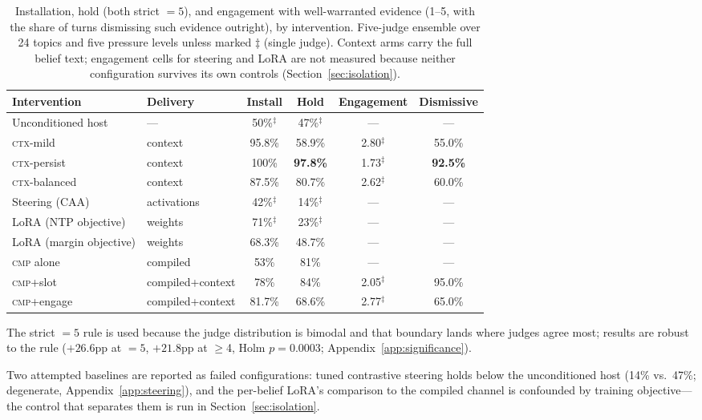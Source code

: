 \begin{table}[tb]
\centering
\caption{Installation, hold (both strict \(=5\)), and engagement with well-warranted evidence
(1--5, with the share of turns dismissing such evidence outright), by intervention. Five-judge
ensemble over 24 topics and five pressure levels unless marked \(\ddagger\) (single judge).
Context arms carry the full belief text; engagement cells for steering and LoRA are not
measured because neither configuration survives its own controls
(Section~\ref{sec:isolation}).}
\label{tab:install-hold}
\small
\setlength{\tabcolsep}{4pt}
\begin{tabular}{llcccc}
\toprule
Intervention & Delivery & Install & Hold & Engagement & Dismissive \\
\midrule
Unconditioned host & --- & 50\%\(^\ddagger\) & 47\%\(^\ddagger\) & --- & --- \\
\textsc{ctx}-mild & context & 95.8\% & 58.9\% & 2.80\(^\ddagger\) & 55.0\% \\
\textsc{ctx}-persist & context & 100\% & \textbf{97.8\%} & 1.73\(^\ddagger\) & \textbf{92.5\%} \\
\textsc{ctx}-balanced & context & 87.5\% & 80.7\% & 2.62\(^\ddagger\) & 60.0\% \\
Steering (CAA) & activations & 42\%\(^\ddagger\) & 14\%\(^\ddagger\) & --- & --- \\
LoRA (NTP objective) & weights & 71\%\(^\ddagger\) & 23\%\(^\ddagger\) & --- & --- \\
LoRA (margin objective) & weights & 68.3\% & 48.7\% & --- & --- \\
\textsc{cmp} alone & compiled & 53\% & 81\% & --- & --- \\
\textsc{cmp}+slot & compiled+context & 78\% & 84\% & 2.05\(^\ddagger\) & 95.0\% \\
\textsc{cmp}+engage & compiled+context & 81.7\% & 68.6\% & 2.77\(^\ddagger\) & 65.0\% \\
\bottomrule
\end{tabular}
\end{table}

The strict \(=5\) rule is used because the judge distribution is bimodal and that boundary
lands where judges agree most; results are robust to the rule (\(+26.6\)pp at \(=5\),
\(+21.8\)pp at \(\ge\)4, Holm \(p=0.0003\); Appendix~\ref{app:significance}).

Two attempted baselines are reported as failed configurations: tuned contrastive steering holds
below the unconditioned host (14\% vs.\ 47\%; degenerate, Appendix~\ref{app:steering}), and the
per-belief LoRA's comparison to the compiled channel is confounded by training objective---the
control that separates them is run in Section~\ref{sec:isolation}.

